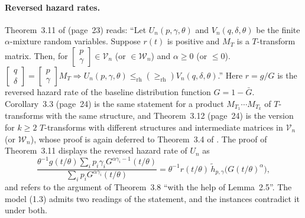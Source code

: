 \documentclass[10pt]{article}
\theoremstyle{plain}
\theoremstyle{definition}
\theoremstyle{remark}
\begin{document}
\paragraph{Reversed hazard rates.} Theorem~3.11 of \cite{SahooKayalFinkelstein2026} (page~23) reads: ``Let $U_n(p,\gamma,\theta)$ and $V_n(q,\delta,\theta)$ be the finite $\alpha$-mixture random variables. Suppose $r(t)$ is positive and $M_T$ is a $T$-transform matrix. Then, for $[\begin{smallmatrix}p\\ \gamma\end{smallmatrix}]\in\mathcal V_n$ (or $\in\mathcal W_n$) and $\alpha\ge0$ (or $\le0$). $[\begin{smallmatrix}q\\ \delta\end{smallmatrix}]=[\begin{smallmatrix}p\\ \gamma\end{smallmatrix}]M_T\Longrightarrow U_n(p,\gamma,\theta)\le_{\mathrm{rh}}(\ge_{\mathrm{rh}})V_n(q,\delta,\theta)$.'' Here $r=g/G$ is the reversed hazard rate of the baseline distribution function $G=1-\bar G$. Corollary~3.3 (page~24) is the same statement for a product $M_{T_1}\cdots M_{T_k}$ of $T$-transforms with the same structure, and Theorem~3.12 (page~24) is the version for $k\ge2$ $T$-transforms with different structures and intermediate matrices in $\mathcal V_n$ (or $\mathcal W_n$), whose proof is again deferred to Theorem~3.4 of \cite{HazraFinkelstein2018}. The proof of Theorem~3.11 displays the reversed hazard rate of $U_n$ as
\begin{equation}\label{eq:rhdisplay}
\frac{\theta^{-1}g(t/\theta)\sum_ip_i\gamma_iG^{\alpha\gamma_i-1}(t/\theta)}{\sum_ip_iG^{\alpha\gamma_i}(t/\theta)}
=\theta^{-1}r(t/\theta)\,\tilde h_{p,\gamma}\bigl(G(t/\theta)^{\alpha}\bigr),
\end{equation}
and refers to the argument of Theorem~3.8 ``with the help of Lemma~2.5''. The model (1.3) admits two readings of the statement, and the instances contradict it under both.
\end{document}

